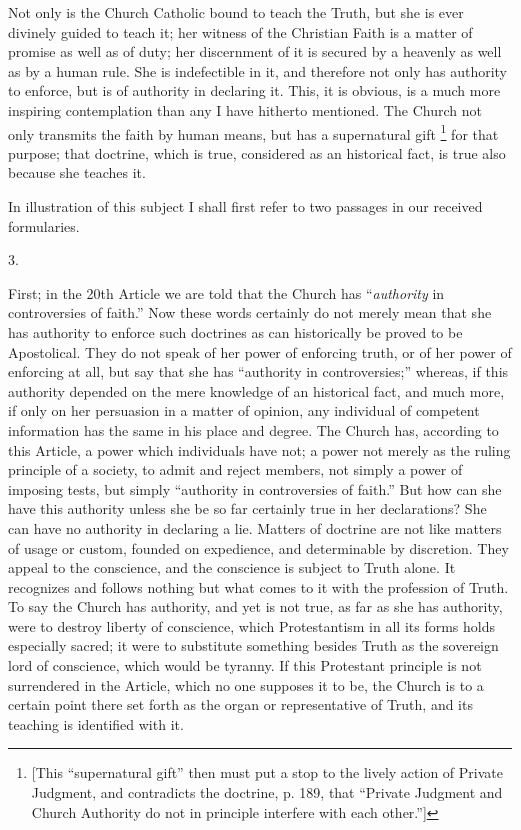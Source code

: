 Not only is the Church Catholic bound to teach the Truth, but she
is ever divinely guided to teach it; her witness of the Christian
Faith is a matter of promise as well as of duty; her discernment of it
is secured by a heavenly as well as by a human rule. She is
indefectible in it, and therefore not only has authority to enforce,
but is of authority in declaring it. This, it is obvious, is a much
more inspiring contemplation than any I have hitherto mentioned. The
Church not only transmits the faith by human means, but has a
supernatural gift \footnote{[This ``supernatural gift'' then
must put a stop to the lively action of Private Judgment, and
contradicts the doctrine, p. 189, that ``Private Judgment and
Church Authority do not in principle interfere with each other.'']} for
that purpose; that doctrine, which is true, considered as an
historical fact, is true also because she teaches it.

In illustration of this subject I shall first refer to two passages
in our received formularies.

3.

First; in the 20th Article we are told that the Church has ``\emph{authority}
in controversies of faith.'' Now these words certainly do not
merely mean that she has authority to enforce such doctrines as can
historically be proved to be Apostolical. They do not speak of her
power of enforcing truth, or of her power of enforcing at all, but say
that she has ``authority in controversies;'' whereas, if this
authority depended on the mere knowledge of an historical fact, and
much more, if only on her persuasion in a matter of opinion, any
individual of competent information has the same in his place and
degree. The Church has, according to this Article, a power which
individuals have not; a power not merely as the ruling principle of a
society, to admit and reject members, not simply a power of imposing
tests, but simply ``authority in controversies of faith.'' But
how can she have this authority unless she be so far certainly true in
her declarations? She can have no authority in declaring a lie.
Matters of doctrine are not like matters of usage or custom, founded
on expedience, and determinable by discretion. They appeal to the
conscience, and the conscience is subject to Truth alone. It
recognizes and follows nothing but what comes to it with the
profession of Truth. To say the Church has authority, and yet is not
true, as far as she has authority, were to destroy liberty of
conscience, which Protestantism in all its forms holds especially
sacred; it were to substitute something besides Truth as the sovereign
lord of conscience, which would be tyranny. If this Protestant
principle is not surrendered in the Article, which no one supposes it
to be, the Church is to a certain point there set forth as the organ
or representative of Truth, and its teaching is identified with it.

